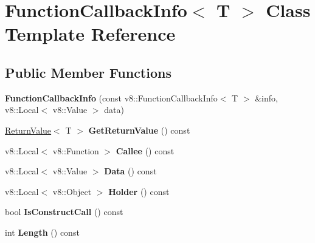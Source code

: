 \hypertarget{class_function_callback_info}{}\section{Function\+Callback\+Info$<$ T $>$ Class Template Reference}
\label{class_function_callback_info}
\subsection*{Public Member Functions}
\begin{DoxyCompactItemize}
\item 
\mbox{\label{class_function_callback_info_ab9cf5e6e8aeab73529e43870d2955f61}} 
{\bfseries Function\+Callback\+Info} (const v8\+::\+Function\+Callback\+Info$<$ T $>$ \&info, v8\+::\+Local$<$ v8\+::\+Value $>$ data)
\item 
\mbox{\label{class_function_callback_info_a5d7d710a75bf076c29cbd8cc9b74682b}} 
\hyperlink{class_return_value}{Return\+Value}$<$ T $>$ {\bfseries Get\+Return\+Value} () const
\item 
\mbox{\label{class_function_callback_info_a8b1709aa2645d4243d5798e0c3d6c1ab}} 
v8\+::\+Local$<$ v8\+::\+Function $>$ {\bfseries Callee} () const
\item 
\mbox{\label{class_function_callback_info_a2c82e7729aead21fa9ac632a40c81083}} 
v8\+::\+Local$<$ v8\+::\+Value $>$ {\bfseries Data} () const
\item 
\mbox{\label{class_function_callback_info_ae4c0667a31ad97de66ba4f08f4c542b9}} 
v8\+::\+Local$<$ v8\+::\+Object $>$ {\bfseries Holder} () const
\item 
\mbox{\label{class_function_callback_info_afa9003e3d8e94dbec2a8ed91bea78140}} 
bool {\bfseries Is\+Construct\+Call} () const
\item 
\mbox{\label{class_function_callback_info_a7a45349f55883b88bee3341a74fbfd81}} 
int {\bfseries Length} () const
\item 

\end{DoxyCompactItemize}
